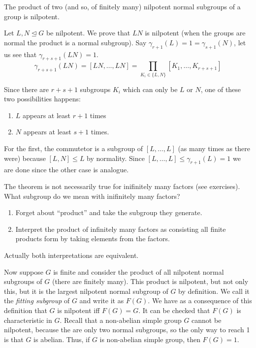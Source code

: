 \documentclass[twoside, 11pt]{article}
\begin{document}
\begin{teorema}
The product of two (and so, of finitely many) nilpotent normal subgroups of a group is nilpotent. 
\end{teorema}
\begin{dem}
Let $L,N\trianglelefteq G$ be nilpotent. We prove that $LN$ is nilpotent (when the groups are normal the product is a normal subgroup). Say $\gamma_{r+1}(L)=1=\gamma_{s+1}(N)$, let us see that $\gamma_{r+s+1}(LN)=1$. $$\gamma_{r+s+1}(LN)=[LN,\dots, LN]=\prod_{K_i\in\{L,N\}}[K_1,\dots, K_{r+s+1}]$$

Since there are $r+s+1$ subgroups $K_i$ which can only be $L$ or $N$, one of these two possibilities happens:
\begin{enumerate}
\item $L$ appears at least $r+1$ times
\item $N$ appears at least $s+1$ times.
\end{enumerate}

For the first, the commutetor is a subgroup of $[L,\dots, L]$ (as many times as there were) because $[L,N]\leq L$ by normality. Since $[L,\dots, L]\leq \gamma_{r+1}(L)=1$ we are done since the other case is analogue.

\end{dem}


\begin{nota}
The theorem is not necessarily true for inifinitely many factors (see exercises). What subgroup do we mean with inifinitely many factors?
\begin{enumerate}
\item Forget about ``product'' and take the subgroup they generate.
\item Interpret the product of infinitely many factors as consisting all finite products form by taking elements from the factors. 
\end{enumerate}

Actually both interpretations are equivalent. 
\end{nota}

Now suppose $G$ is finite and consider the product of all nilpotent normal subgroups of $G$ (there are finitely many). This product is nilpotent, but not only this, but it is the largest nilpotent normal subgroup of $G$ by definition. We call it the \emph{fitting subgroup} of $G$ and write it as $F(G)$. We have as a consequence of this definition that $G$ is nilpotent iff $F(G)=G$. It can be checked that $F(G)$ is characteristic in $G$. Recall that a non-abelian simple group $G$ cannot be nilpotent, because the are only two normal subgroups, so the only way to reach 1 is that $G$ is abelian. Thus, if $G$ is non-abelian simple group, then $F(G)=1$. 
\end{document}

